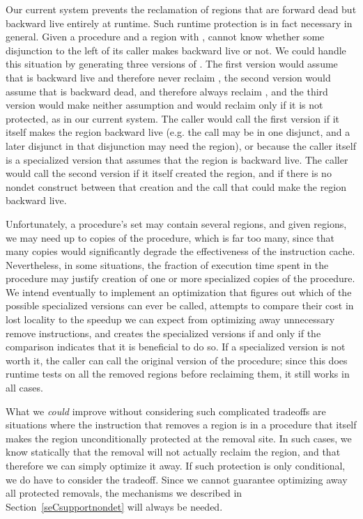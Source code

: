 \documentclass{tlp}
\begin{document}
Our current system prevents the reclamation of regions
that are forward dead but backward live entirely at runtime.
Such runtime protection is in fact necessary in general.
Given a procedure  and a region  with ,
 cannot know whether some disjunction to the left of its caller
makes  backward live or not.
We could handle this situation by generating three versions of .
The first version would assume that  is backward live
and therefore never reclaim ,
the second version would assume that  is backward dead,
and therefore always reclaim ,
and the third version
would make neither assumption
and would reclaim  only if it is not protected,
as in our current system.
The caller would call the first version
if it itself makes the region backward live
(e.g. the call may be in one disjunct,
and a later disjunct in that disjunction may need the region),
or because the caller itself is a specialized version
that assumes that the region is backward live.
The caller would call the second version if it itself created the region,
and if there is no nondet construct between that creation and the call
that could make the region backward live.

Unfortunately, a procedure's  set may contain several regions,
and given  regions, we may need up to  copies of the procedure,
which is far too many,
since that many copies
would significantly degrade the effectiveness of the instruction cache.
Nevertheless, in some situations,
the fraction of execution time spent in the procedure
may justify creation of one or more specialized copies of the procedure.
We intend eventually to implement an optimization
that figures out which of the possible specialized versions can ever be called,
attempts to compare their cost in lost locality
to the speedup we can expect
from optimizing away unnecessary remove instructions,
and creates the specialized versions if and only if
the comparison indicates that it is beneficial to do so.
If a specialized version is not worth it,
the caller can call the original version of the procedure;
since this does runtime tests on all the removed regions
before reclaiming them, it still works in all cases.

What we \emph{could} improve without considering such complicated tradeoffs
are situations where the instruction that removes a region is in a procedure
that itself makes the region unconditionally protected at the removal site.
In such cases, we know statically
that the removal will not actually reclaim the region,
and that therefore we can simply optimize it away.
If such protection is only conditional,
we do have to consider the tradeoff.
Since we cannot guarantee optimizing away all protected removals,
the mechanisms we described in Section~\ref{seCsupportnondet}
will always be needed.
\end{document}
